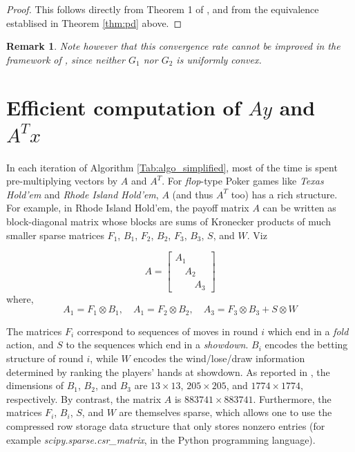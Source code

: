 \documentclass[12pt]{article}
\newtheorem{remark}{Remark}
\begin{document}
\begin{proof}
This follows directly from Theorem 1 of \cite{chambolle2010}, and from the equivalence establised in Theorem \ref{thm:pd} above.
\end{proof}

\begin{remark}
Note however that this convergence rate cannot be improved in the framework of \cite{chambolle2010}, since neither $G_1$ nor $G_2$ is \textit{uniformly convex}.
\end{remark}

\section{Efficient computation of $Ay$ and $A^Tx$}
In each iteration of Algorithm \ref{Tab:algo_simplified}, most of the time is spent
pre-multiplying vectors by $A$ and $A^T$. For \textit{flop}-type Poker games like \textit{Texas Hold'em} and  \textit{Rhode Island Hold'em}, $A$ (and thus $A^T$ too) has a rich structure. For example, in Rhode Island Hold'em, the payoff matrix $A$ can be written as block-diagonal matrix whose blocks are sums of Kronecker products of much smaller sparse matrices \cite{hoda2010smoothing} $F_1$, $B_1$, $F_2$, $B_2$, $F_3$, $B_3$, $S$, and $W$. Viz

\begin{equation}
  A = \begin{bmatrix}A_1\hspace{2em}\\\hspace{1em}A_2\hspace{1em}\\\hspace{2em}A_3\end{bmatrix}
\label{eq:factor_A}
\end{equation}
where,
\begin{equation}
A_1 = F_1 \otimes B_1, \hspace{1em} A_1 = F_2 \otimes B_2, \hspace{1em} A_3 = F_3 \otimes B_3 + S \otimes W
\end{equation}

The matrices $F_i$ correspond to sequences of moves in round $i$ which end in a \textit{fold} action, and $S$ to the sequences which end in a \textit{showdown}. $B_i$ encodes the betting structure of round $i$, while $W$ encodes the wind/lose/draw information determined by ranking the players' hands at showdown. As reported in \cite{hoda2010smoothing}, the dimensions of $B_1$, $B_2$, and $B_3$ are $13 \times 13$, $205 \times 205$, and $1774 \times 1774$, respectively. By
contrast, the matrix $A$ is $883741 \times 883741$. Furthermore, the matrices $F_i$, $B_i$,
$S$, and $W$ are themselves sparse, which allows one to use the compressed row storage data structure that only stores nonzero entries (for example \textit{scipy.sparse.csr\_matrix}, in the Python programming language).
\end{document}
